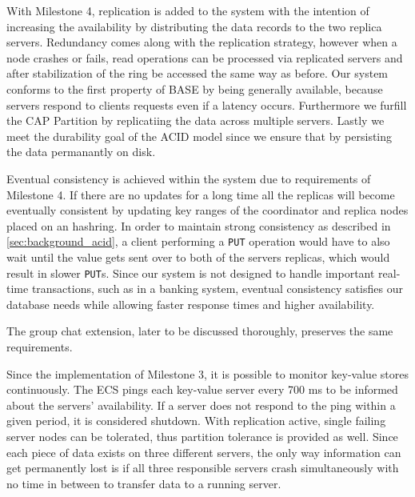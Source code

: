 With Milestone 4, replication is added to the system with the intention of increasing the availability by distributing the data records to the two replica servers. Redundancy comes along with the replication strategy, however when a node crashes or fails, read operations can be processed via replicated servers and after stabilization of the ring be accessed the same way as before.
Our system conforms to the first property of BASE by being generally available, because servers respond to clients requests even if a latency occurs. Furthermore we furfill the CAP Partition by replicatiing the data across multiple servers. Lastly we meet the durability goal of the ACID model since we ensure that by persisting the data permanantly on disk.

Eventual consistency is achieved within the system due to requirements of Milestone 4. If there are no updates for a long time all the replicas will become eventually consistent by updating key ranges of the coordinator and replica nodes placed on an hashring. In order to maintain strong consistency as described in \ref{sec:background_acid}, a client performing a \texttt{PUT} operation would have to also wait until the value gets sent over to both of the servers replicas, which would result in slower \texttt{PUT}s. Since our system is not designed to handle important real-time transactions, such as in a banking system, eventual consistency satisfies our database needs while allowing faster response times and higher availability. 

The group chat extension, later to be discussed thoroughly, preserves the same requirements.

Since the implementation of Milestone 3, it is possible to monitor key-value stores continuously. The ECS pings each key-value server every 700 ms to be informed about the servers’ availability. If a server does not respond to the ping within a given period, it is considered shutdown. With replication active, single failing server nodes can be tolerated, thus partition tolerance is provided as well. Since each piece of data exists on three different servers, the only way information can get permanently lost is if all three responsible servers crash simultaneously with no time in between to transfer data to a running server.


